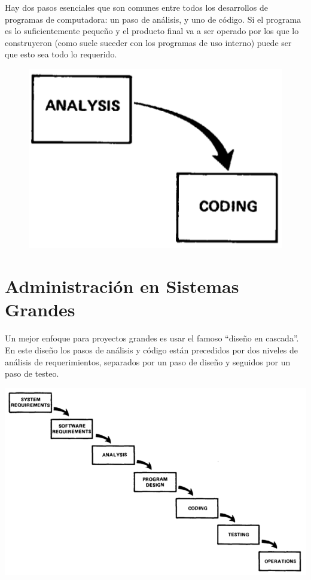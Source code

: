 \documentclass{beamer}
\begin{document}
\begin{frame}[fragile]
Hay dos pasos esenciales que son comunes entre todos los desarrollos de programas de computadora: un paso de análisis, y uno de código. Si el programa es lo suficientemente pequeño y el producto final va a ser operado por los que lo construyeron (como suele suceder con los programas de uso interno) puede ser que esto sea todo lo requerido.

\begin{figure}[h]
\includegraphics[width=.3\textwidth]{figures/small.png}
\end{figure}

\vspace{-1em}


\end{frame}

\setcounter{figure}{1}

\section{Administración en Sistemas Grandes}

\begin{frame}[fragile]
Un mejor enfoque para proyectos grandes es usar el famoso ``diseño en cascada''. En este diseño los pasos de análisis y código están precedidos por dos niveles de análisis de requerimientos, separados por un paso de diseño y seguidos por un paso de testeo.

\begin{center}
\includegraphics[height=.7\textheight]{figures/large.png}
\end{center}

\end{frame}
\end{document}
